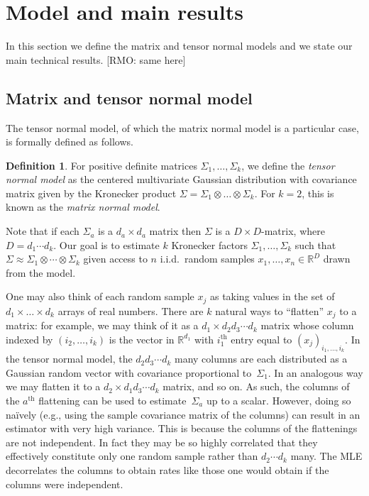 \documentclass[aos]{imsart}
\theoremstyle{definition}
\newtheorem*{definition}{Definition}
\numberwithin{equation}{section}
\newcommand{\R}{{\mathbb{R}}}
\newcommand{\ot}{\otimes}
\newcommand{\RMO}[1]{{\color{olive}[RMO: #1]}}
\newcommand{\RMO}[1]{{}}
\begin{document}
\section{Model and main results}\label{sec:main results}
In this section we define the matrix and tensor normal models and we state our main technical results.
\RMO{same here}

\subsection{Matrix and tensor normal model}\label{subsec:model}
The tensor normal model, of which the matrix normal model is a particular case, is formally defined as follows.

\begin{definition}
For positive definite matrices $\Sigma_1,\dots,\Sigma_k$, we define the \emph{tensor normal model} as the centered multivariate Gaussian distribution with covariance matrix given by the Kronecker product $\Sigma = \Sigma_1 \ot \dots \ot \Sigma_k$.
For $k=2$, this is known as the \emph{matrix normal model}.
\end{definition}

\noindent
Note that if each $\Sigma_a$ is a $d_a\times d_a$ matrix then $\Sigma$ is a $D\times D$-matrix, where $D=d_1 \cdots d_k$.
Our goal is to estimate $k$ Kronecker factors $\Sigma_1, \dots, \Sigma_k$ such that $\Sigma \approx \Sigma_1 \ot \cdots \ot \Sigma_k$ given access to $n$ i.i.d.\ random samples $x_1, \dots, x_n \in \R^D$ drawn from the model.

One may also think of each random sample $x_j$ as taking values in the set of $d_1 \times \dots \times d_k$ arrays of real numbers.
There are $k$ natural ways to ``flatten'' $x_j$ to a matrix:
for example, we may think of it as a $d_1 \times d_2d_3\cdots{}d_k$ matrix whose column indexed by $(i_2,\dots, i_k)$ is the vector in $\R^{d_1}$ with $i_1^{\text{th}}$ entry equal to $(x_j)_{i_1, \dots, i_k}$.
In the tensor normal model, the $d_2d_3\cdots{}d_k$ many columns are each distributed as a Gaussian random vector with covariance proportional to~$\Sigma_1$.
In an analogous way we may flatten it to a $d_2 \times d_1d_3\cdots{}d_k$ matrix, and so on.
As such, the columns of the $a^{\text{th}}$ flattening can be used to estimate~$\Sigma_a$ up to a scalar.
However, doing so na\"ively (e.g., using the sample covariance matrix of the columns) can result in an estimator with very high variance.
This is because the columns of the flattenings are not independent.
In fact they may be so highly correlated that they effectively constitute only one random sample rather than $d_2\cdots{}d_k$ many.
The MLE decorrelates the columns to obtain rates like those one would obtain if the columns were independent.
\end{document}
